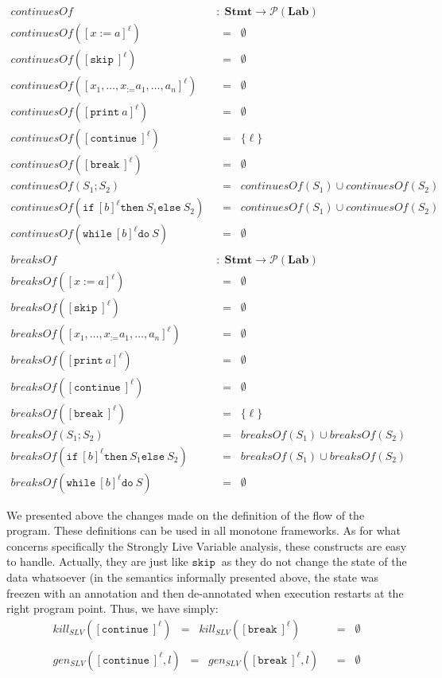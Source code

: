 \documentclass[a4wide,12pt]{article}
\def\eq{\;\; = \;\;}
\def\pset#1{\mathcal{P}(#1)}
\def\Stmt {\mathbf{Stmt}}
\def\Lab {\mathbf{Lab}}
\def\skip {\texttt{skip}\ }
\def\while{\texttt{while}\ }
\def\do {\texttt{do}\ }
\def\ifl {\texttt{if}\ }
\def\thenl {\texttt{then}\ }
\def\elsel {\texttt{else}\ }
\def\print{\texttt{print}\ }
\def\cont {\texttt{continue}\ }
\def\break{\texttt{break}\ }
\begin{document}
\begin{align*}
continuesOf & \; : \; \Stmt \to \pset{\Lab} \\
continuesOf([x:=a]^\ell) & \eq \emptyset \\
continuesOf([\skip]^\ell) & \eq \emptyset \\
continuesOf([x_1,\ldots,x_:=a_1,\ldots,a_n]^\ell) & \eq \emptyset \\
continuesOf([\print a]^\ell) & \eq \emptyset \\
continuesOf([\cont]^\ell) & \eq \{\ell\} \\
continuesOf([\break]^\ell) & \eq \emptyset \\
continuesOf(S_1;S_2) & \eq continuesOf(S_1) \cup continuesOf(S_2) \\
continuesOf(\ifl [b]^\ell \thenl S_1 \elsel S_2) & \eq continuesOf(S_1) \cup continuesOf(S_2) \\
continuesOf(\while [b]^\ell \do S) & \eq \emptyset \\
\\
breaksOf & \; : \; \Stmt \to \pset{\Lab} \\
breaksOf([x:=a]^\ell) & \eq \emptyset \\
breaksOf([\skip]^\ell) & \eq \emptyset \\
breaksOf([x_1,\ldots,x_:=a_1,\ldots,a_n]^\ell) & \eq \emptyset \\
breaksOf([\print a]^\ell) & \eq \emptyset \\
breaksOf([\cont]^\ell) & \eq \emptyset \\
breaksOf([\break]^\ell) & \eq \{\ell\} \\
breaksOf(S_1;S_2) & \eq breaksOf(S_1) \cup breaksOf(S_2) \\
breaksOf(\ifl [b]^\ell \thenl S_1 \elsel S_2) & \eq breaksOf(S_1) \cup breaksOf(S_2) \\
breaksOf(\while [b]^\ell \do S) & \eq \emptyset
\end{align*}
 
We presented above the changes made on the definition of the flow of the program.
These definitions can be used in all monotone frameworks. As for what concerns specifically
the Strongly Live Variable analysis, these constructs are easy to handle. Actually, they
are just like $\skip$ as they do not change the state of the data whatsoever (in the
semantics informally presented above, the state was freezen with an annotation and then de-annotated
when execution restarts at the right program point. Thus, we have simply:
\begin{align*}
kill_{SLV}([\cont]^\ell) \eq kill_{SLV}([\break]^\ell) & \eq \emptyset \\
\\
gen_{SLV} ([\cont]^\ell,l) \eq gen_{SLV} ([\break]^\ell,l) & \eq \emptyset
\end{align*}
 
\end{document}
